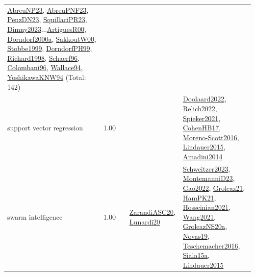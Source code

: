 {\begin{longtable}{p{3cm}r>{\raggedright\arraybackslash}p{6cm}>{\raggedright\arraybackslash}p{6cm}>{\raggedright\arraybackslash}p{8cm}}
\hyperref[detail:AbreuNP23]{AbreuNP23}, \hyperref[detail:AbreuPNF23]{AbreuPNF23}, \hyperref[detail:PenzDN23]{PenzDN23}, \hyperref[detail:SquillaciPR23]{SquillaciPR23}, \hyperref[detail:Dimny2023]{Dimny2023}...\hyperref[detail:ArtiguesR00]{ArtiguesR00}, \hyperref[detail:Dorndorf2000a]{Dorndorf2000a}, \hyperref[detail:SakkoutW00]{SakkoutW00}, \hyperref[detail:Stobbe1999]{Stobbe1999}, \hyperref[detail:DorndorfPH99]{DorndorfPH99}, \hyperref[detail:Richard1998]{Richard1998}, \hyperref[detail:Schaerf96]{Schaerf96}, \hyperref[detail:Colombani96]{Colombani96}, \hyperref[detail:Wallace94]{Wallace94}, \hyperref[detail:YoshikawaKNW94]{YoshikawaKNW94} (Total: 142)\\
\index{support vector regression}\index{Algorithms!support vector regression}support vector regression &  1.00 &  &  & \hyperref[detail:Doolaard2022]{Doolaard2022}, \hyperref[detail:Relich2022]{Relich2022}, \hyperref[detail:Spieker2021]{Spieker2021}, \hyperref[detail:CohenHB17]{CohenHB17}, \hyperref[detail:Moreno-Scott2016]{Moreno-Scott2016}, \hyperref[detail:Lindauer2015]{Lindauer2015}, \hyperref[detail:Amadini2014]{Amadini2014}\\
\index{swarm intelligence}\index{Algorithms!swarm intelligence}swarm intelligence &  1.00 &  & \hyperref[detail:ZarandiASC20]{ZarandiASC20}, \hyperref[detail:Lunardi20]{Lunardi20} & \hyperref[detail:Schweitzer2023]{Schweitzer2023}, \hyperref[detail:MontemanniD23]{MontemanniD23}, \hyperref[detail:Gao2022]{Gao2022}, \hyperref[detail:Groleaz21]{Groleaz21}, \hyperref[detail:HamPK21]{HamPK21}, \hyperref[detail:Hosseinian2021]{Hosseinian2021}, \hyperref[detail:Wang2021]{Wang2021}, \hyperref[detail:GroleazNS20a]{GroleazNS20a}, \hyperref[detail:Novas19]{Novas19}, \hyperref[detail:Teschemacher2016]{Teschemacher2016}, \hyperref[detail:Siala15a]{Siala15a}, \hyperref[detail:Lindauer2015]{Lindauer2015}\\

\end{longtable}}
